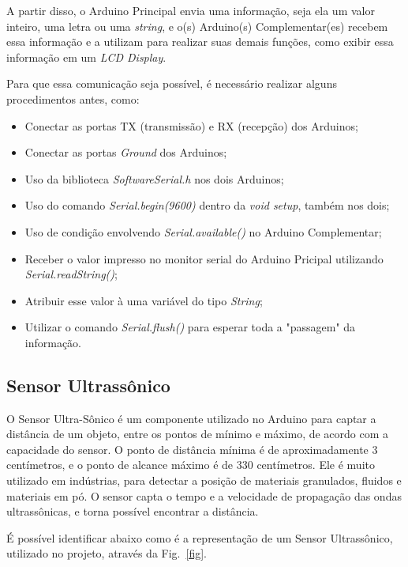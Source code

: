 \documentclass[conference]{IEEEtran}
\begin{document}
    A partir disso, o Arduino Principal envia uma informação, seja ela um valor inteiro, uma letra ou uma
\emph{string}, e o(s) Arduino(s) Complementar(es) recebem essa informação e a utilizam para realizar suas
demais funções, como exibir essa informação em um \emph{LCD Display}. 

    Para que essa comunicação seja possível, é necessário realizar alguns procedimentos antes, como:
    \begin{itemize}
        \item Conectar as portas TX (transmissão) e RX (recepção) dos Arduinos;
        \item Conectar as portas \emph{Ground} dos Arduinos;
        \item Uso da biblioteca \emph{SoftwareSerial.h} nos dois Arduinos;
        \item Uso do comando \emph{Serial.begin(9600)} dentro da \emph{void setup}, também nos dois;
        \item Uso de condição envolvendo \emph{Serial.available()} no Arduino Complementar;
        \item Receber o valor impresso no monitor serial do Arduino Pricipal utilizando 
        \emph{Serial.readString()};
        \item Atribuir esse valor à uma variável do tipo \emph{String};
        \item Utilizar o comando \emph{Serial.flush()} para esperar toda a "passagem" da informação.
    \end{itemize}

\subsection{Sensor Ultrassônico}

    O Sensor Ultra-Sônico é um componente utilizado no Arduino para captar a distância de um objeto, 
entre os pontos de mínimo e máximo, de acordo com a capacidade do sensor. O ponto de distância mínima 
é de aproximadamente 3 centímetros, e o ponto de alcance máximo é de 330 centímetros. Ele é muito
utilizado em indústrias, para detectar a posição de materiais granulados, fluidos e materiais em pó.
O sensor capta o tempo e a velocidade de propagação das ondas ultrassônicas, e torna possível encontrar
a distância.

É possível identificar abaixo como é a representação de um Sensor Ultrassônico, utilizado no projeto, 
através da Fig.~\ref{fig}.
\end{document}
